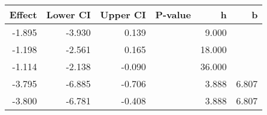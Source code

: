 \begin{table}[ht]
\centering
\begin{tabular}{rrrrrr}
  \hline
Effect & Lower CI & Upper CI & P-value & h & b \\ 
  \hline
-1.895 & -3.930 & 0.139 &  & 9.000 &  \\ 
  -1.198 & -2.561 & 0.165 &  & 18.000 &  \\ 
  -1.114 & -2.138 & -0.090 &  & 36.000 &  \\ 
  -3.795 & -6.885 & -0.706 &  & 3.888 & 6.807 \\ 
  -3.800 & -6.781 & -0.408 &  & 3.888 & 6.807 \\ 
   \hline
\end{tabular}
\end{table}
